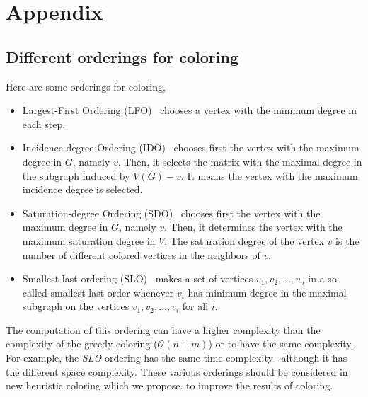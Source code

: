 \documentclass[12pt, twoside,a4paper,toc=bibliography]{scrbook}
\begin{document}


\chapter*{Appendix}
\label{appendix}
\setcounter{chapter}{1}
\renewcommand\thechapter{\Alph{chapter}}
\section{Different orderings for coloring}
\label{app.ord}
Here are some orderings for coloring,
\begin{itemize}
\item Largest-First Ordering (LFO)~\cite{LFO} chooses a vertex with the minimum degree in each step.
\item Incidence-degree Ordering (IDO)~\cite{IDO} chooses first the vertex with the maximum degree in $G$, namely $v$. Then, it selects the matrix with the maximal degree in the subgraph induced by $V(G)-v$. It means the vertex with the maximum incidence degree is selected.
\item Saturation-degree Ordering (SDO)~\cite{SDO} chooses first the vertex with the maximum degree in $G$, namely $v$. Then, it determines the vertex with the maximum saturation degree in
$V$. The saturation degree of the vertex $v$ is the number of different colored vertices in the neighbors of $v$.
\item Smallest last ordering (SLO)~\cite{ordering1} makes a set of vertices ${v_1,v_2,...,v_n}$ in a so-called smallest-last
order whenever $v_i$ has minimum degree in the maximal subgraph on the vertices $v_1,v_2,...,v_i$ for all $i$.
\end{itemize}
The computation of this ordering can have a higher complexity than the complexity of the greedy coloring ($\mathcal{O}(n+m)$) or to have the same complexity. For example, the \textit{SLO} ordering has the same time complexity~\cite{ordering1} although it has the different space complexity. These various orderings should be considered in new heuristic coloring which we propose. to improve the results of coloring.
\clearpage
\end{document}
